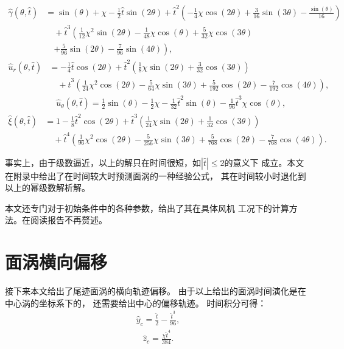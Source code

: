 \documentclass[UTF8,zihao=5]{ctexart} %
\begin{document}
\begin{align} \hat{\gamma}(\theta,\hat{t}) &= \sin (\theta ) + \chi -\frac{1}{2} \hat{t} \sin (2 \theta ) +\hat{t}^{2} \left(-\frac{1}{4} \chi \cos (2 \theta )+\frac{3}{16} \sin (3 \theta )-\frac{\sin (\theta )}{16}\right) \nonumber\\ &\quad +\hat{t}^{3} \left(\frac{1}{12} \chi ^{2} \sin (2 \theta )-\frac{1}{48} \chi \cos (\theta )+\frac{5}{32} \chi \cos (3 \theta ) \right.\nonumber\\ &\quad \left.+\frac{5}{96} \sin (2\theta )-\frac{7}{96} \sin (4 \theta )\right),  \end{align}
\begin{align} \hat{u}_r(\theta,\hat{t}) &={-}\frac{1}{4} \hat{t} \cos (2 \theta )+ \hat{t}^{2} \left(\frac{1}{8} \chi \sin (2 \theta )+\frac{3}{32} \cos (3 \theta )\right) \nonumber\\ &\quad + \hat{t}^{3} \left(\frac{1}{24} \chi ^{2} \cos (2 \theta )-\frac{5}{64} \chi \sin (3 \theta )+\frac{5}{192} \cos (2 \theta )-\frac{7}{192} \cos (4 \theta )\right),  \end{align}
\begin{align} &\qquad\ \hat{u}_{\theta}(\theta,\hat{t}) = \frac{1}{2}\sin (\theta ) - \frac{1 }{2}\chi -\frac{1}{32} \hat{t}^{2} \sin (\theta ) -\frac{1}{96} \hat{t}^{3} \chi \cos (\theta ), \end{align}
\begin{align} \hat{\xi}(\theta,\hat{t}) &= 1 -\frac{1}{8} \hat{t}^{2} \cos (2 \theta )+\hat{t}^{3} \left(\frac{1}{24} \chi \sin (2 \theta )+\frac{1}{32} \cos (3 \theta )\right)\nonumber\\ &\quad +\hat{t}^{4} \left(\frac{1}{96} \chi ^{2} \cos (2 \theta)-\frac{5}{256} \chi \sin (3 \theta )+\frac{5}{768} \cos (2 \theta)-\frac{7}{768} \cos (4 \theta )\right). \end{align}

事实上，由于级数逼近，以上的解只在时间很短，如$|\hat {t}|\leq2$的意义下
成立。本文在附录中给出了在时间较大时预测面涡的一种经验公式，
其在时间较小时退化到以上的幂级数解析解。

本文还专门对于初始条件中的各种参数，给出了其在具体风机
工况下的计算方法。在阅读报告不再赘述。

\section{面涡横向偏移}

接下来本文给出了尾迹面涡的横向轨迹偏移。
由于以上给出的面涡时间演化是在中心涡的坐标系下的，
还需要给出中心的偏移轨迹。
时间积分可得：
\begin{gather} \hat{y}_c=\frac{\hat{t}}{2}-\frac{\hat{t}^{3}}{96}, \end{gather}
\begin{gather}\hat{z}_c=\frac{\chi\hat{t}^{4}}{384}. \end{gather}
\end{document}
